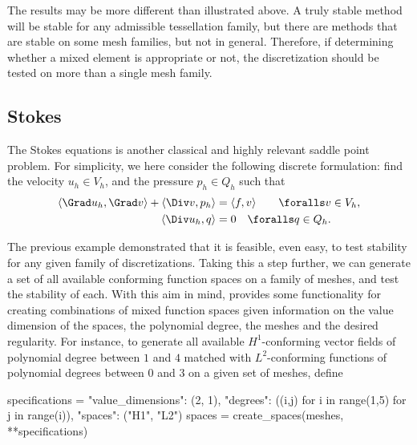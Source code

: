 The results may be more different than illustrated above. A truly
stable method will be stable for any admissible tessellation family,
but there are methods that are stable on some mesh families, but not
in general.  Therefore, if determining whether a mixed element is
appropriate or not, the discretization should be tested on more than a
single mesh family.

\subsection{Stokes}

The Stokes equations is another classical and highly relevant saddle
point problem. For simplicity, we here consider the following discrete
formulation: find the velocity $u_h \in V_h$, and the pressure $p_h
\in Q_h$ such that
\begin{equation}
  \label{rognes:eq:stokes}
  \begin{split}
    \langle \Grad u_h, \Grad v \rangle + \langle \Div v, p_h \rangle &=
    \langle f, v \rangle
    \quad\quad \foralls v \in V_h, \\
    \langle \Div u_h, q \rangle &= 0
    \quad \foralls q \in Q_h.
  \end{split}
\end{equation}

The previous example demonstrated that it is feasible, even easy, to
test stability for any given family of discretizations. Taking this a
step further, we can generate a set of all available conforming
function spaces on a family of meshes, and test the stability of
each. With this aim in mind, \rognesascot{} provides some
functionality for creating combinations of mixed function spaces given
information on the value dimension of the spaces, the polynomial
degree, the meshes and the desired regularity. For instance, to
generate all available $H^1$-conforming vector fields of polynomial
degree between $1$ and $4$ matched with $L^2$-conforming functions of
polynomial degrees between $0$ and $3$ on a given set of meshes,
define
\begin{python}
specifications = {"value_dimensions": (2, 1),
                  "degrees": ((i,j) for i in range(1,5) for j in range(i)),
                  "spaces": ("H1", "L2")}
spaces = create_spaces(meshes, **specifications)
\end{python}

